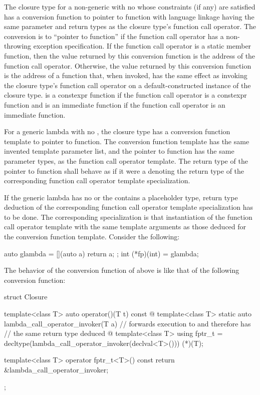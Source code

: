 \pnum
The closure type for a non-generic  with no
whose constraints (if any) are satisfied
has a conversion function to pointer to
function with \Cpp{} language linkage having
the same parameter and return types as the closure type's function call operator.
The conversion is to ``pointer to  function''
if the function call operator
has a non-throwing exception specification.
If the function call operator is a static member function,
then the value returned by this conversion function is
the address of the function call operator.
Otherwise, the value returned by this conversion function
is the address of a function  that, when invoked,
has the same effect as invoking the closure type's function call operator
on a default-constructed instance of the closure type.
 is a constexpr function
if the function call operator is a constexpr function
and is an immediate function
if the function call operator is an immediate function.

\pnum
For a generic lambda with no , the closure type has a
conversion function template to
pointer to function. The conversion function template has the same invented
template parameter list, and the pointer to function has the same
parameter types, as the function call operator template.  The return type of
the pointer to function shall behave as if it were a
 denoting the return type of the corresponding
function call operator template specialization.

\pnum
\begin{note}
If the generic lambda has no  or
the  contains a placeholder type, return type
deduction of the corresponding function call operator template specialization
has to be done. The corresponding specialization is that instantiation of the
function call operator template with the same template arguments as those
deduced for the conversion function template.  Consider the following:
\begin{codeblock}
auto glambda = [](auto a) { return a; };
int (*fp)(int) = glambda;
\end{codeblock}
The behavior of the conversion function of  above is like
that of the following conversion function:
\begin{codeblock}
struct Closure {
  template<class T> auto operator()(T t) const { @\commentellip@ }
  template<class T> static auto lambda_call_operator_invoker(T a) {
    // forwards execution to  and therefore has
    // the same return type deduced
    @\commentellip@
  }
  template<class T> using fptr_t =
     decltype(lambda_call_operator_invoker(declval<T>())) (*)(T);

  template<class T> operator fptr_t<T>() const
    { return &lambda_call_operator_invoker; }
};
\end{codeblock}
\end{note}

